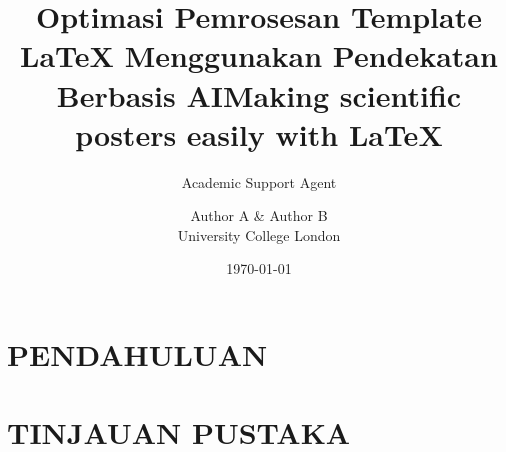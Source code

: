 \documentclass{a0poster}
\title{Optimasi Pemrosesan Template LaTeX Menggunakan Pendekatan Berbasis AI}
\author{Academic Support Agent}
\date{\today}
\begin{document}
\maketitle

\begin{abstract}

\end{abstract}

\chapter{PENDAHULUAN}


\chapter{TINJAUAN PUSTAKA}


\usepackage{multicol} 			%
\usepackage[left=2cm,right=2cm,bottom=0cm,top=0cm]{geometry}			%
\usepackage{mathpazo}			%
\usepackage{color}				%

\fboxsep=1cm							%
\setlength{\columnsep}{2cm}				%

\makeatletter							%
\renewcommand\@maketitle{%
\null									%
{
\color{headingcol}\sffamily\VERYHuge		%
\@title \par}%
\vskip 0.6em%
{
\color{white}\sffamily\large				%
\lineskip .5em%
\begin{tabular}[t]{l}%
\@author
\end{tabular}\par}%
\vskip 1cm
\par
}
\makeatother

\title{Making scientific posters easily with \LaTeX}

\author{Author A \& Author B\\
University College London}
\end{document}
